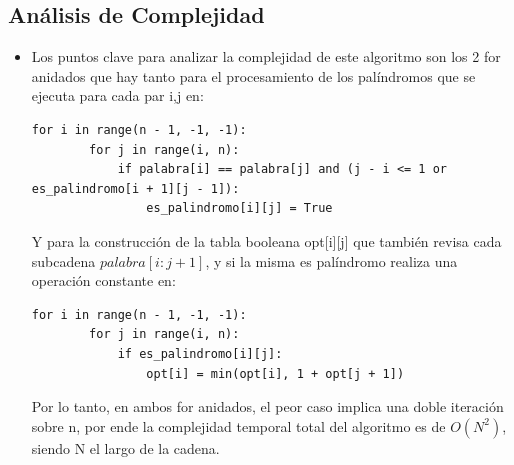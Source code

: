 \documentclass[a4paper, 12pt]{article}
\begin{document}
\newpage
\subsection{Análisis de Complejidad}
\begin{itemize}
    \item Los puntos clave para analizar la complejidad de este algoritmo son los 2 for anidados que hay tanto para el procesamiento de los palíndromos que se ejecuta para cada par i,j en:
    
	\begin{lstlisting}[frame=single]
    for i in range(n - 1, -1, -1):
        for j in range(i, n):
            if palabra[i] == palabra[j] and (j - i <= 1 or es_palindromo[i + 1][j - 1]):
                es_palindromo[i][j] = True
	\end{lstlisting}

    Y para la construcción de la tabla booleana opt[i][j] que también revisa cada subcadena \(palabra[i:j+1]\), y si la misma es palíndromo realiza una operación constante en: 
    \begin{lstlisting}[frame=single]
    for i in range(n - 1, -1, -1):
        for j in range(i, n):
            if es_palindromo[i][j]:
                opt[i] = min(opt[i], 1 + opt[j + 1])
	\end{lstlisting}

    Por lo tanto, en ambos for anidados, el peor caso implica una doble iteración sobre n, por ende la complejidad temporal total del algoritmo es de \(O(N^2)\), siendo N el largo de la cadena. 

\end{itemize}

\newpage
\end{document}
